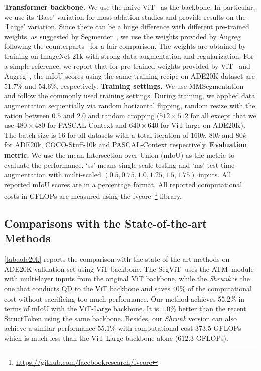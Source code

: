 \documentclass{article}
\makeatletter
\renewcommand{\paragraph}{\@startsection{paragraph}{4}{\z@}{.5ex \@plus 1ex \@minus .2ex}{-1em}{\normalfont\normalsize\bfseries}}
\def\atm{ATM}
\def\seg{SegViT}
\makeatother
\begin{document}
\textbf{Transformer backbone.} 
We use the naive ViT~\cite{vit} as the backbone. In particular, we use its `Base' variation for most ablation studies and provide results on the `Large' variation. Since there can be a huge difference with different pre-trained weights, as suggested by Segmenter~\cite{strudel2021segmenter}, we use the weights provided by Augreg~\cite{augreg} following the counterparts~\cite{strudel2021segmenter, lin2022structtoken} for a fair comparison. The weights are obtained by training on ImageNet-21k with strong data augmentation and regularization. For a simple reference, we report that for pre-trained weights provided by ViT~\cite{vit} and Augreg~\cite{augreg}, the mIoU scores using the same training recipe on ADE20K dataset are $51.7\%$ and $54.6\%$, respectively. 
\textbf{Training settings.}
We use MMSegmentation \cite{mmseg} and follow the commonly used training settings. 
During training, we applied data augmentation sequentially via random horizontal flipping, random resize with the ration between $0.5$ and $2.0$ and random cropping ($512\times 512$ for all except that we use $480 \times 480$ for PASCAL-Context and $640\times 640$ for ViT-large on ADE20K).
The batch size is $16$ for all datasets with a total iteration of $160k$, $80k$ and $80k$ for ADE20k, COCO-Stuff-10k and PASCAL-Context respectively. 
\textbf{Evaluation metric.} We use the mean Intersection over Union (mIoU) as the metric to evaluate the performance. `ss' means single-scale testing and `ms' test time augmentation with multi-scaled $(0.5, 0.75, 1.0, 1.25, 1.5, 1.75)$ inputs. All reported mIoU scores are in a percentage format. All reported computational costs in GFLOPs are measured using the fvcore~\footnote{\url{https://github.com/facebookresearch/fvcore}} library.




\subsection{Comparisons with the State-of-the-art Methods}
\paragraph{Results on ADE20K.}
\cref{tab:ade20k} reports the comparison with the state-of-the-art methods on ADE20K validation set using ViT backbone. 
The \seg\ uses
the \atm\ module with multi-layer inputs from the original ViT backbone, while the \emph{Shrunk} is the one that conducts QD to the ViT backbone and  saves $40\%$ of the computational cost without sacrificing too much performance. Our method achieves $55.2\%$ in terms of mIoU with the ViT-Large backbone. It is $1.0\%$ better than the recent StructToken \cite{lin2022structtoken} using the same backbone. Besides, our \emph{Shrunk} version can also achieve a similar performance $55.1\%$ with computational cost $373.5$ GFLOPs which is much less than the ViT-Large backbone alone ($612.3$ GFLOPs).
\end{document}
